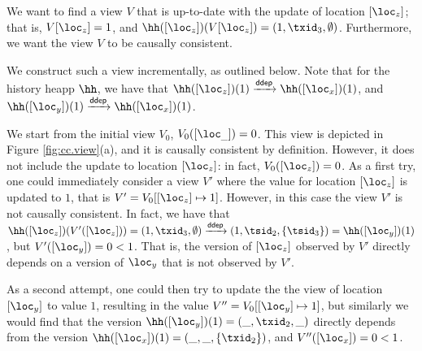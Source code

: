 %
% 
We want to find a view $V$ that is up-to-date with the update of location $[\loc_z]$; 
that is, $V[\loc_z] = 1$, and $\hh([\loc_z])(V[\loc_z]) = (1, \txid_3, \emptyset)$.
Furthermore, we want the view $V$ to be causally consistent. 

We construct such a view incrementally, as outlined below. 
Note that for the history heapp $\hh$, we have that 
$\hh([\loc_z])(1) \xrightarrow{\mathsf{ddep}} \hh([\loc_x])(1)$, 
and $\hh([\loc_y])(1) \xrightarrow{\mathsf{ddep}} \hh([\loc_x])(1)$.


We start from the initial view $V_0$, $V_0([\loc_{\_}]) = 0$. This view is 
depicted in Figure \ref{fig:cc.view}(a), and it is 
causally consistent by definition. However, it does not include the update to location $[\loc_z]$: in
 fact, $V_0([\loc_z]) = 0$. As a first try, one could immediately consider a view $V'$ 
where the value for location $[\loc_z]$ is updated to $1$, 
that is $V' = V_0[ [\loc_z] \mapsto 1]$. However, in this case 
the view $V'$ is not causally consistent. In fact, 
we have that $\hh([\loc_z])(V'([\loc_z])) = (1, \txid_3, \emptyset) \xrightarrow{\mathsf{ddep}} 
(1, \tsid_2, \{\tsid_3\}) = \hh([\loc_y])(1)$, but $V'([\loc_y]) = 0 < 1$. 
That is, the version of $[\loc_z]$ observed by $V'$ directly depends on a version 
of $\loc_y$ that is not observed by $V'$.
%

As a second attempt, one could then try to update the the view of location 
$[\loc_y]$ to value $1$, resulting in the value $V'' = V_0[ [\loc_y] \mapsto 1]$, 
but similarly we would find that the version 
$\hh([\loc_y])(1) = (\_, \txid_2, \_)$ directly depends from the version 
$\hh([\loc_x])(1) = (\_, \_, \{\txid_2\})$, and $V''([\loc_x]) = 0 < 1$. 

